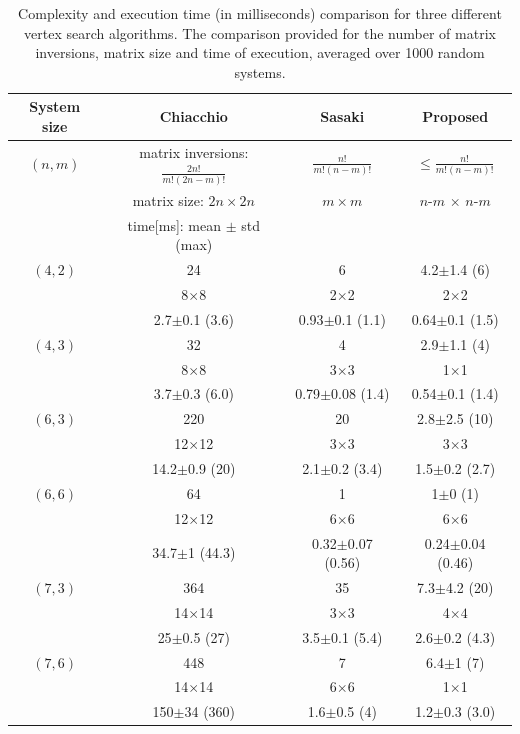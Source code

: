 \begin{table}[!h]
    \centering
    \caption{Complexity and execution time (in milliseconds) comparison for three different vertex search algorithms. The comparison provided for the number of matrix inversions, matrix size and time of execution, averaged over 1000 random systems. }
    \begin{tabular}{|c|c|c|c|}
       \hline
      \textbf{ System size }& \textbf{Chiacchio}\cite{chiacchio_evaluation_1996} & \textbf{Sasaki} \cite{sasaki_vertex_nodate}  &  \textbf{Proposed} \\
       \hline
       $(n,m)$& matrix inversions: $ \frac{2n!}{m!(2n-m)!}$  & $ \frac{n!}{m!(n-m)!} $ & $ \leq \frac{n!}{m!(n-m)!}$ \\
       &  matrix size:  $ 2n \times 2n$ & $m\times m$  & $n$-$m$ $\times$ $n$-$m$\\
       & time[ms]: mean $\pm$ std (max) & & \\
       \hline
       $(4,2)$ &  24 & 6 & 4.2$\pm$1.4 (6) \\ 
       & 8$\times$8 & 2$\times$2 & 2$\times$2 \\ 
       & 2.7$\pm$0.1 (3.6) & 0.93$\pm$0.1 (1.1) & 0.64$\pm$0.1 (1.5) \\ 
       \hline
       $(4,3)$ &  32 & 4 & 2.9$\pm$1.1 (4) \\ 
       & 8$\times$8 & 3$\times$3 & 1$\times$1 \\ 
       & 3.7$\pm$0.3 (6.0) & 0.79$\pm$0.08 (1.4) & 0.54$\pm$0.1 (1.4) \\ 
       \hline
       $(6,3)$ & 220 & 20 & 2.8$\pm$2.5 (10) \\ 
        & 12$\times$12 & 3$\times$3 & 3$\times$3 \\ 
       & 14.2$\pm$0.9 (20) & 2.1$\pm$0.2 (3.4) & 1.5$\pm$0.2 (2.7) \\ 
       \hline
      $(6,6)$&   64 & 1 & 1$\pm$0 (1)\\
        &  12$\times$12 & 6$\times$6 & 6$\times6$\\
       & 34.7$\pm$1 (44.3) & 0.32$\pm$0.07 (0.56) & 0.24$\pm$0.04 (0.46)\\
       \hline
      $(7,3)$&    364 & 35 & 7.3$\pm$4.2 (20)\\
        & 14$\times$14 & 3$\times$3 & 4$\times4$\\
       & 25$\pm$0.5 (27) & 3.5$\pm$0.1 (5.4) & 2.6$\pm$0.2 (4.3)\\
       \hline
      $(7,6)$& 448 & 7 & 6.4$\pm$1 (7)\\
        & 14$\times$14 & 6$\times$6 & 1$\times$1\\
       & 150$\pm$34 (360) & 1.6$\pm$0.5 (4) & 1.2$\pm$0.3 (3.0)\\
       \hline
    \end{tabular}
    \label{tab:complexity_results}
\end{table}


